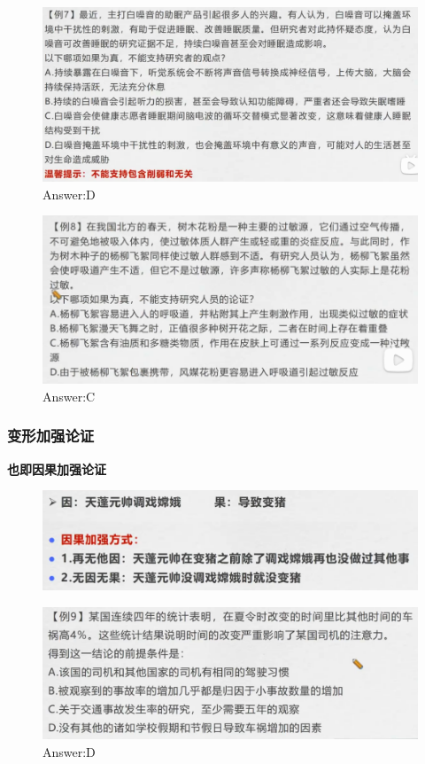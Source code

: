\documentclass{article}
\numberwithin{equation}{section}						%
\numberwithin{figure}{section}							%
\begin{document}
\begin{sloppypar}
\begin{figure}[H]
     \centering
     \includegraphics[width=0.6\linewidth]{228.png}
		\caption{Answer:D}
\end{figure}


\begin{figure}[H]
     \centering
     \includegraphics[width=0.6\linewidth]{229.png}
		\caption{Answer:C}
\end{figure}

\subsubsection{变形加强论证}

\textbf{也即因果加强论证}

\begin{figure}[H]
     \centering
     \includegraphics[width=0.6\linewidth]{230.png}
\end{figure}

\begin{figure}[H]
     \centering
     \includegraphics[width=0.6\linewidth]{231.png}
		\caption{Answer:D}
\end{figure}



\end{sloppypar}
\end{document}
